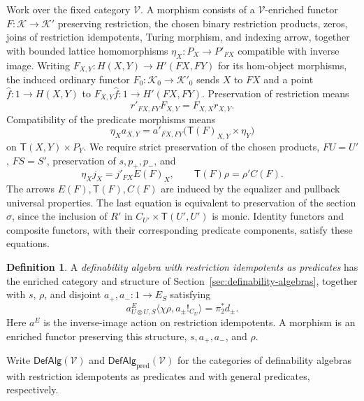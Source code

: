 \documentclass[11pt]{article}
\theoremstyle{definition}
\newtheorem{definition}[theorem]{Definition}
\theoremstyle{remark}
\begin{document}
Work over the fixed category $\mathscr V$. A morphism consists of
a $\mathscr V$-enriched functor $F:\mathcal K\to\mathcal K'$
preserving restriction, the chosen binary restriction products, zeros, joins of restriction idempotents,
Turing morphism, and indexing arrow, together with bounded lattice
homomorphisms $\eta_X:P_X\to P'_{FX}$ compatible with inverse image.
Writing $F_{X,Y}:H(X,Y)\to H'(FX,FY)$ for its hom-object
morphisms, the induced ordinary functor
$F_0:\mathcal K_0\to\mathcal K'_{0}$ sends $X$ to $FX$ and
a point $\widehat f:1\to H(X,Y)$ to
$F_{X,Y}\widehat f:1\to H'(FX,FY)$.
Preservation of restriction means
\[
 r'_{FX,FY}F_{X,Y}=F_{X,X}r_{X,Y}.
\]
Compatibility of the predicate morphisms means
\[
 \eta_Xa_{X,Y}
   =a'_{FX,FY}\bigl(\mathsf T(F)_{X,Y}\times\eta_Y\bigr)
\]
on $\mathsf T(X,Y)\times P_Y$.
We require strict preservation of the chosen products, $FU=U'$,
$FS=S'$, preservation of $s,p_+,p_-$, and
\[
 \eta_Xj_X=j'_{FX}E(F)_X,
 \qquad \mathsf T(F)\rho=\rho'C(F).
\]
The arrows $E(F),\mathsf T(F),C(F)$ are induced by the equalizer and
pullback universal properties. The last equation is equivalent to
preservation of the section $\sigma$, since the inclusion of $R'$
in $C_{U'}\times\mathsf T(U',U')$ is monic.
Identity functors and composite functors, with their corresponding
predicate components, satisfy these equations.

\begin{definition}\label{def:original-definability-algebra}
A \emph{definability algebra with restriction idempotents as predicates}
has the enriched category and structure of
Section~\ref{sec:definability-algebras}, together with $s$, $\rho$, and disjoint
$a_+,a_-:1\to E_S$ satisfying
\begin{equation}\label{eq:original-algebra-representation}
 a^E_{U\otimes U,S}\langle\chi\rho,a_\pm!_{C_U}\rangle
   =\pi_2^*d_\pm.
\end{equation}
Here $a^E$ is the inverse-image action on restriction idempotents.
A morphism is an enriched functor preserving this structure,
$s,a_+,a_-$, and $\rho$.
\end{definition}

Write $\mathsf{DefAlg}(\mathscr V)$ and
$\mathsf{DefAlg}_{\mathrm{pred}}(\mathscr V)$ for the categories of
definability algebras with restriction idempotents as predicates and with general predicates, respectively.
\end{document}
